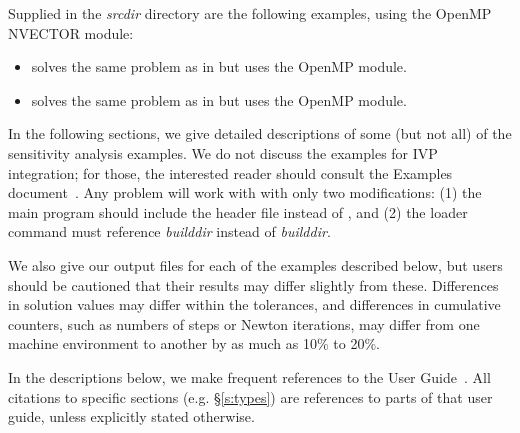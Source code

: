 
\vspace{0.2in}\noindent 
Supplied in the {\em srcdir} directory are
the following examples, using the OpenMP NVECTOR module:

\begin{itemize}

\item {} solves the same problem as in
 but uses the OpenMP module. 

\item {} solves the same problem as in
 but uses the OpenMP module. 

\end{itemize}


\vspace{0.2in}\noindent
In the following sections, we give detailed descriptions of some (but
not all) of the sensitivity analysis examples. We do not discuss the 
examples for IVP integration; for those, the interested reader should consult
the {\ida} Examples document~\cite{ida_ex}. Any {\ida} problem
will work with {\idas} with only two modifications: (1) the main program
should include the header file  instead of , and
(2) the loader command must reference
{\em builddir} instead of
{\em builddir}.

We also give our output files for each of the examples described below,
but users should be cautioned that their results may differ slightly from these.
Differences in solution values may differ within the tolerances, and differences
in cumulative counters, such as numbers of steps or Newton iterations, may differ
from one machine environment to another by as much as 10\% to 20\%.

In the descriptions below, we make frequent references to the {\idas}
User Guide~\cite{idas_ug}.  All citations to specific sections
(e.g. \S\ref{s:types}) are references to parts of that user guide, unless
explicitly stated otherwise.

